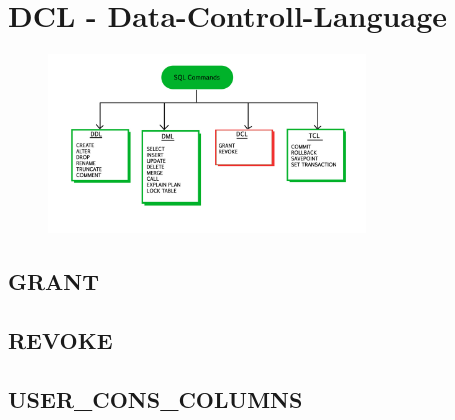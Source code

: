 \section[DCL]{DCL - Data-Controll-Language}
\label{sec:dcl}

\begin{figure}[h]
  \centering
  \includegraphics[width=0.75\textwidth]{img//sql-commands-dcl.jpg}
  \label{img:dcl}
\end{figure}

\subsection{GRANT}
\label{sec:dcl.grant}

\subsection{REVOKE}
\label{sec:dcl.revoke}

\subsection{USER\_CONS\_COLUMNS}
\label{sec:dcl.user_cons_columns}
